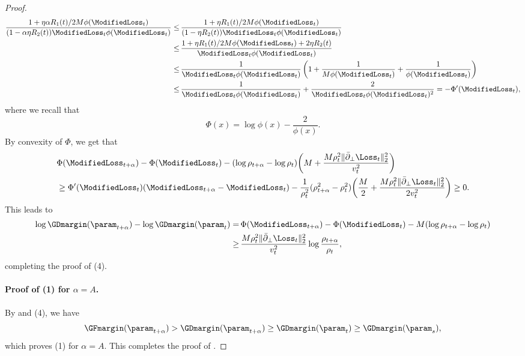 \begin{proof}
\begin{align*}
        \frac{1+ \eta \alpha R_1 (t) / 2M \phi(\ModifiedLoss_t)}{(1- \alpha \eta R_2 (t)) \ModifiedLoss_t \phi(\ModifiedLoss_t)} \le \, & \frac{1+ \eta R_1 (t) / 2M \phi(\ModifiedLoss_t)}{(1- \eta R_2 (t)) \ModifiedLoss_t \phi(\ModifiedLoss_t)} \\
        \le \, & \frac{1 + \eta R_1 (t) / 2M \phi(\ModifiedLoss_t) + 2 \eta R_2 (t) }{\ModifiedLoss_t \phi(\ModifiedLoss_t)} \\
        \le \, & \frac{1}{\ModifiedLoss_t \phi(\ModifiedLoss_t)} \left( 1 + \frac{1}{ M \phi(\ModifiedLoss_t)} + \frac{1}{\phi(\ModifiedLoss_t)} \right) \\
        \le \, & \frac{1}{\ModifiedLoss_t \phi(\ModifiedLoss_t)} + \frac{2}{\ModifiedLoss_t \phi(\ModifiedLoss_t)^2} = - \Phi'(\ModifiedLoss_t),
    \end{align*}
    where we recall that
    \begin{equation*}
        \Phi(x) = \log \phi(x) - \frac{2}{\phi(x)}.
    \end{equation*}
    By convexity of $\Phi$, we get that
    \begin{align*}
        &\Phi(\ModifiedLoss_{t+\alpha}) - \Phi(\ModifiedLoss_t)  - (\log \rho_{t+\alpha} - \log \rho_t) \bigg( M+  \frac{M\rho_t^2\|\bar \partial_\perp  \Loss_t\|_2^2}{v_t^2} \bigg)\\ 
        & \ge  \Phi^\prime (\ModifiedLoss_t) (\ModifiedLoss_{t+\alpha} - \ModifiedLoss_t)  - \frac{1}{\rho_t^2}(\rho_{t+\alpha}^2 - \rho_t^2)   \bigg( \frac{M}{2}+  \frac{M\rho_t^2\|\bar \partial_\perp \Loss_t\|_2^2}{2v_t^2} \bigg) \ge 0. 
    \end{align*}
    This leads to 
    \begin{align*}
        \log \GDmargin(\param_{t+\alpha}) - \log \GDmargin(\param_t) = \, & \Phi (\ModifiedLoss_{t+\alpha}) - \Phi(\ModifiedLoss_t)- M (\log \rho_{t+\alpha} - \log \rho_t) \\
        \ge \, & \frac{M \rho_t^2 \| \bar \partial_\perp \Loss_t \|_2^2}{v_t^2 } \log \frac{\rho_{t+\alpha}}{\rho_t},
    \end{align*}
    completing the proof of (4).

    \paragraph{Proof of (1) for $\alpha = A$.} By  and (4), we have
    \begin{equation*}
        \GFmargin (\param_{t + \alpha}) > \GDmargin (\param_{t+\alpha}) \ge \GDmargin (\param_t) \ge \GDmargin (\param_s),
    \end{equation*}
    which proves (1) for $\alpha = A$. This completes the proof of . 
\end{proof}

